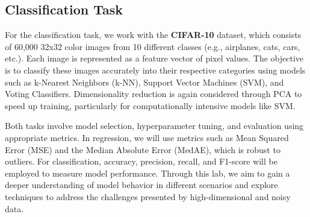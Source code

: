 \documentclass[twocolumn]{article}
\begin{document}
\subsection{Classification Task}

For the classification task, we work with the \textbf{CIFAR-10} dataset, which consists of 60,000 32x32 color images from 10 different classes (e.g., airplanes, cats, cars, etc.). Each image is represented as a feature vector of pixel values. The objective is to classify these images accurately into their respective categories using models such as k-Nearest Neighbors (k-NN), Support Vector Machines (SVM), and Voting Classifiers. Dimensionality reduction is again considered through PCA to speed up training, particularly for computationally intensive models like SVM.

Both tasks involve model selection, hyperparameter tuning, and evaluation using appropriate metrics. In regression, we will use metrics such as Mean Squared Error (MSE) and the Median Absolute Error (MedAE), which is robust to outliers. For classification, accuracy, precision, recall, and F1-score will be employed to measure model performance. Through this lab, we aim to gain a deeper understanding of model behavior in different scenarios and explore techniques to address the challenges presented by high-dimensional and noisy data.
\end{document}
